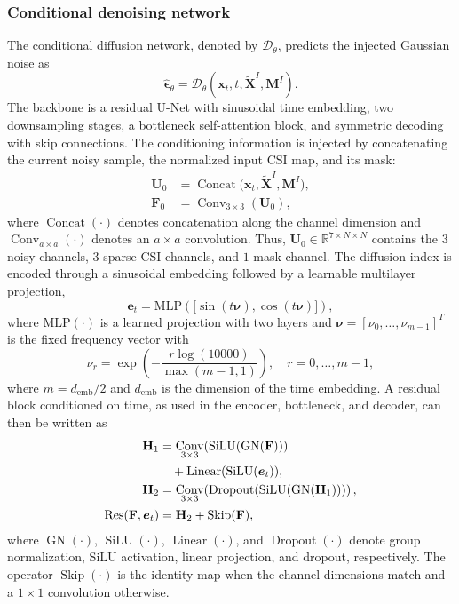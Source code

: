 \documentclass[lettersize,journal]{IEEEtran}
\newcommand{\vect}[1]{\boldsymbol{#1}}
\newcommand{\mat}[1]{\mathbf{#1}}
\DeclareMathOperator{\Concat}{Concat}
\DeclareMathOperator{\Conv}{Conv}
\DeclareMathOperator{\GN}{GN}
\DeclareMathOperator{\SiLU}{SiLU}
\DeclareMathOperator{\Linear}{Linear}
\DeclareMathOperator{\Dropout}{Dropout}
\DeclareMathOperator{\Skip}{Skip}
\DeclareMathOperator{\Res}{Res}
\begin{document}
\subsubsection{Conditional denoising network}

The conditional diffusion network, denoted by $\mathcal{D}_{\theta}$, predicts the injected Gaussian noise as
\begin{equation}
    \widehat{\vect{\epsilon}}_{\theta}=\mathcal{D}_{\theta}(\mat{x}_t,t,\widetilde{\mat{X}}^{I},\mat{M}^{I}).
    \label{eq:noise_prediction}
\end{equation}
The backbone is a residual U-Net with sinusoidal time embedding, two downsampling stages, a bottleneck self-attention block, and symmetric decoding with skip connections. The conditioning information is injected by concatenating the current noisy sample, the normalized input CSI map, and its mask:
\begin{align}
    \mat{U}_0
    &=\Concat\big(\mat{x}_t,\widetilde{\mat{X}}^{I},\mat{M}^{I}\big), \\
    \mat{F}_0
    &=\Conv_{3\times 3}(\mat{U}_0),
    \label{eq:diff_input_projection}
\end{align}
where $\Concat(\cdot)$ denotes concatenation along the channel dimension and $\Conv_{a\times a}(\cdot)$ denotes an $a\times a$ convolution. Thus, $\mat{U}_0\in\mathbb{R}^{7\times N\times N}$ contains the $3$ noisy channels, $3$ sparse CSI channels, and $1$ mask channel.
The diffusion index is encoded through a sinusoidal embedding followed by a learnable multilayer projection,
\begin{equation}
    \vect{e}_t=\mathrm{MLP}\!\left(
    \big[\sin(t\boldsymbol{\nu}),\cos(t\boldsymbol{\nu})\big]
    \right),
    \label{eq:time_embedding}
\end{equation}
where $\mathrm{MLP}(\cdot)$ is a learned projection with two layers and $\boldsymbol{\nu}=[\nu_0,\ldots,\nu_{m-1}]^T$ is the fixed frequency vector with
\begin{equation}
    \nu_r=\exp\!\left(-\frac{r\log(10000)}{\max(m-1,1)}\right),
    \quad r=0,\ldots,m-1,
    \label{eq:time_frequency}
\end{equation}
where $m=d_{\mathrm{emb}}/2$ and $d_{\mathrm{emb}}$ is the dimension of the time embedding. A residual block conditioned on time, as used in the encoder, bottleneck, and decoder, can then be written as
\begin{align}
    \mat{H}_1
    &=\Conv_{3\times 3}\!\left(\SiLU(\GN(\mat{F}))\right) \notag\\
    &\quad+\Linear(\SiLU(\vect{e}_t)), \\
    \mat{H}_2
    &=\Conv_{3\times 3}\!\left(\Dropout(\SiLU(\GN(\mat{H}_1)))\right), \\
    \Res(\mat{F},\vect{e}_t)
    &=\mat{H}_2+\Skip(\mat{F}),
    \label{eq:time_resblock}
\end{align}
where $\GN(\cdot)$, $\SiLU(\cdot)$, $\Linear(\cdot)$, and $\Dropout(\cdot)$ denote group normalization, SiLU activation, linear projection, and dropout, respectively. The operator $\Skip(\cdot)$ is the identity map when the channel dimensions match and a $1\times1$ convolution otherwise.
\end{document}
